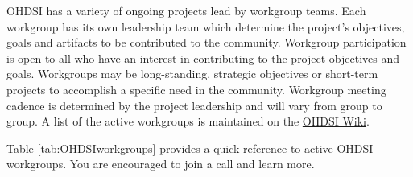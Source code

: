 \documentclass[11pt]{book}
\theoremstyle{definition}
\theoremstyle{definition}
\theoremstyle{definition}
\theoremstyle{remark}
\begin{document}
OHDSI has a variety of ongoing projects lead by workgroup teams. Each
workgroup has its own leadership team which determine the project's
objectives, goals and artifacts to be contributed to the community.
Workgroup participation is open to all who have an interest in
contributing to the project objectives and goals. Workgroups may be
long-standing, strategic objectives or short-term projects to accomplish
a specific need in the community. Workgroup meeting cadence is
determined by the project leadership and will vary from group to group.
A list of the active workgroups is maintained on the
\href{https://www.ohdsi.org/web/wiki/doku.php?id=projects:overview}{OHDSI
Wiki}. 

Table \ref{tab:OHDSIworkgroups} provides a quick reference to active
OHDSI workgroups. You are encouraged to join a call and learn more.
\end{document}
